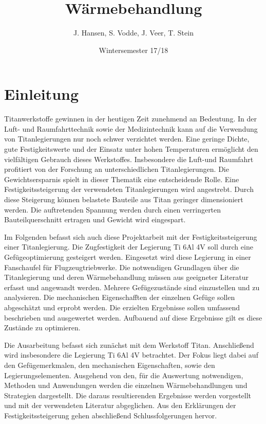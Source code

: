 \documentclass[a4paper, 11pt]{tubsreprt}
\title{Wärmebehandlung}
\date{Wintersemester 17/18}
\author{J. Hansen, S. Vodde,
 J. Veer, T. Stein}
\begin{document}
\maketitle
\tableofcontents
{}
\chapter*{Einleitung}
Titanwerkstoffe gewinnen in der heutigen Zeit zunehmend an Bedeutung. In der Luft- und Raumfahrttechnik sowie der Medizintechnik kann auf die Verwendung von Titanlegierungen nur noch schwer verzichtet werden. Eine geringe Dichte, gute Festigkeitswerte und der Einsatz unter hohen Temperaturen ermöglicht den vielfältigen Gebrauch dieses Werkstoffes. Insbesondere die Luft-und Raumfahrt profitiert von der Forschung an unterschiedlichen Titanlegierungen. Die Gewichtsersparnis spielt in dieser Thematik eine entscheidende Rolle. Eine Festigkeitssteigerung der verwendeten Titanlegierungen wird angestrebt. Durch diese Steigerung können belastete Bauteile aus Titan geringer dimensioniert werden. Die auftretenden Spannung werden durch einen verringerten Bauteilquerschnitt ertragen und Gewicht wird eingespart. 
  
Im Folgenden befasst sich auch diese Projektarbeit mit der Festigkeitssteigerung einer Titanlegierung. Die Zugfestigkeit der Legierung Ti 6Al 4V soll durch eine Gefügeoptimierung gesteigert werden. Eingesetzt wird diese Legierung in einer Fanschaufel für Flugzeugtriebwerke. Die notwendigen Grundlagen über die Titanlegierung und deren Wärmebehandlung müssen aus geeigneter Literatur erfasst und angewandt werden. Mehrere Gefügezustände sind einzustellen und zu analysieren. Die mechanischen Eigenschafften der einzelnen Gefüge sollen abgeschätzt und erprobt werden. Die erzielten Ergebnisse sollen umfassend beschrieben und ausgewertet werden. Aufbauend auf diese Ergebnisse gilt es diese Zustände zu optimieren.  
 
Die Ausarbeitung befasst sich zunächst mit dem Werkstoff Titan. Anschließend wird insbesondere die Legierung Ti 6Al 4V betrachtet. Der Fokus liegt dabei auf den Gefügemerkmalen, den mechanischen Eigenschaften, sowie den Legierungselementen. Ausgehend von den, für die Auswertung notwendigen, Methoden und Anwendungen werden die einzelnen Wärmebehandlungen und Strategien dargestellt. Die daraus resultierenden Ergebnisse werden vorgestellt und mit der verwendeten Literatur abgeglichen. Aus den Erklärungen der Festigkeitssteigerung gehen abschließend Schlussfolgerungen hervor.
\end{document}
